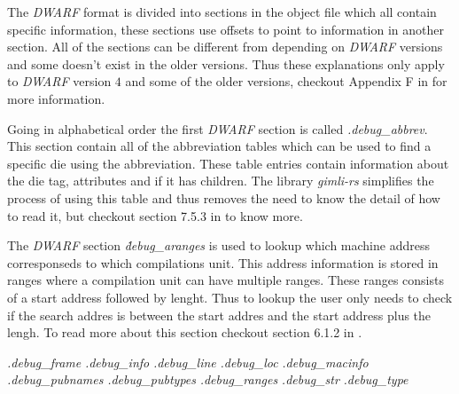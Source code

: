  


The \emph{DWARF} format is divided into sections in the object file which all contain specific information, these sections use offsets to point to information in another section.
All of the sections can be different from depending on \emph{DWARF} versions and some doesn't exist in the older versions.
Thus these explanations only apply to \emph{DWARF} version $4$ and some of the older versions, checkout Appendix F in \cite{dwarf} for more information.


Going in alphabetical order the first \emph{DWARF} section is called \emph{.debug\_abbrev}.
This section contain all of the abbreviation tables which can be used to find a specific die using the abbreviation.
These table entries contain information about the die tag, attributes and if it has children.
The library \emph{gimli-rs} simplifies the process of using this table and thus removes the need to know the detail of how to read it, but checkout section 7.5.3 in \cite{dwarf} to know more.


The \emph{DWARF} section \emph{\.debug\_aranges} is used to lookup which machine address corresponseds to which compilations unit.
This address information is stored in ranges where a compilation unit can have multiple ranges.
These ranges consists of a start address followed by lenght.
Thus to lookup the user only needs to check if the search addres is between the start addres and the start address plus the lengh.
To read more about this section checkout section 6.1.2 in \cite{dwarf}.

\emph{.debug\_frame}
\emph{.debug\_info}
\emph{.debug\_line}
\emph{.debug\_loc}
\emph{.debug\_macinfo}
\emph{.debug\_pubnames}
\emph{.debug\_pubtypes}
\emph{.debug\_ranges}
\emph{.debug\_str}
\emph{.debug\_type}


